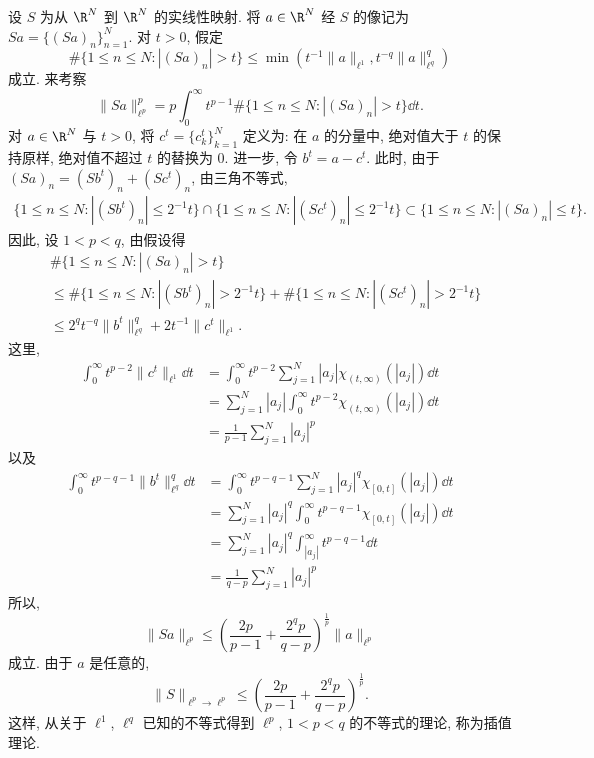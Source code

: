 设 $S$ 为从 $\R^{N}$ 到 $\R^{N}$ 的实线性映射. 将 $a \in \R^{N}$ 经 $S$ 的像记为 $Sa = \{(Sa)_{n}\}_{n=1}^{N}$. 对 $t > 0$, 假定
\[
\# \{1 \leq n \leq N : |(Sa)_{n}| > t\} \leq \min(t^{-1}\|a\|_{\ell^{1}}, t^{-q}\|a\|_{\ell^{q}}^{q})
\]
成立. 来考察
\[
\|Sa\|_{\ell^{p}}^{p} = p\int_{0}^{\infty} t^{p-1} \# \{1 \leq n \leq N : |(Sa)_{n}| > t\} \dd t.
\]
对 $a \in \R^{N}$ 与 $t > 0$, 将 $c^{t} = \{c_{k}^{t}\}_{k=1}^{N}$ 定义为: 在 $a$ 的分量中, 绝对值大于 $t$ 的保持原样, 绝对值不超过 $t$ 的替换为 $0$. 进一步, 令 $b^{t} = a - c^{t}$. 此时, 由于 $(Sa)_{n} = (Sb^{t})_{n} + (Sc^{t})_{n}$, 由三角不等式,
\begin{align*}
\{1 \leq n \leq N : |(Sb^{t})_{n}| \leq 2^{-1}t\} \cap \{1 \leq n \leq N : |(Sc^{t})_{n}| \leq 2^{-1}t\} \subset \{1 \leq n \leq N : |(Sa)_{n}| \leq t\}.
\end{align*}
因此, 设 $1 < p < q$, 由假设得
\begin{align*}
& \# \{1 \leq n \leq N : |(Sa)_{n}| > t\} \\
& \leq \# \{1 \leq n \leq N : |(Sb^{t})_{n}| > 2^{-1}t\} + \# \{1 \leq n \leq N : |(Sc^{t})_{n}| > 2^{-1}t\} \\
& \leq 2^{q}t^{-q}\|b^{t}\|_{\ell^{q}}^{q} + 2t^{-1}\|c^{t}\|_{\ell^{1}}.
\end{align*}
这里,
\begin{align*}
\int_{0}^{\infty} t^{p-2}\|c^{t}\|_{\ell^{1}} \dd t & = \int_{0}^{\infty} t^{p-2}\sum_{j=1}^{N} |a_{j}|\chi_{(t,\infty)}(|a_{j}|) \dd t \\
& = \sum_{j=1}^{N} |a_{j}|\int_{0}^{\infty} t^{p-2}\chi_{(t,\infty)}(|a_{j}|) \dd t \\
& = \frac{1}{p-1}\sum_{j=1}^{N} |a_{j}|^{p}
\end{align*}
以及
\begin{align*}
\int_{0}^{\infty} t^{p-q-1}\|b^{t}\|_{\ell^{q}}^{q} \dd t & = \int_{0}^{\infty} t^{p-q-1}\sum_{j=1}^{N} |a_{j}|^{q}\chi_{[0,t]}(|a_{j}|) \dd t \\
& = \sum_{j=1}^{N} |a_{j}|^{q}\int_{0}^{\infty} t^{p-q-1}\chi_{[0,t]}(|a_{j}|) \dd t \\
& = \sum_{j=1}^{N} |a_{j}|^{q}\int_{|a_{j}|}^{\infty} t^{p-q-1} \dd t \\
& = \frac{1}{q-p}\sum_{j=1}^{N} |a_{j}|^{p}
\end{align*}
所以,
\begin{equation}\tag{1.8}\label{eq:1.8}
\|Sa\|_{\ell^{p}} \leq \left(\frac{2p}{p-1} + \frac{2^{q}p}{q-p}\right)^{\frac{1}{p}}\|a\|_{\ell^{p}}
\end{equation}
成立. 由于 $a$ 是任意的,
\[
\|S\|_{\ell^{p} \to \ell^{p}} \leq \left(\frac{2p}{p-1} + \frac{2^{q}p}{q-p}\right)^{\frac{1}{p}}.
\]
这样, 从关于 $\ell^{1}$, $\ell^{q}$ 已知的不等式得到 $\ell^{p}$, $1 < p < q$ 的不等式的理论, 称为插值理论.


